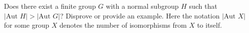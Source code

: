 Does there exist a finite group $ G$ with a normal subgroup $ H$ such that $ |\text{Aut } H| > |\text{Aut } G|$? Disprove or provide an example. Here the notation $ |\text{Aut } X|$ for some group $ X$ denotes the number of isomorphisms from $ X$ to itself.